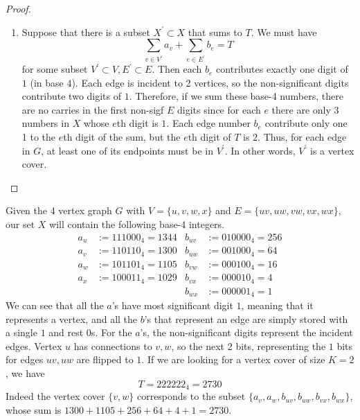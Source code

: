 \begin{proof}
\begin{enumerate}
      \item Suppose that there is a subset $X^\prime \subset X$ that sums to $T$. We must have 
      \begin{equation}
        \sum_{v \in V^\prime} a_v + \sum_{e \in E^\prime} b_e = T
      \end{equation}
      for some subset $V^\prime \subset V, E^\prime \subset E$. Then each $b_e$ contributes exactly one digit of $1$ (in base 4). Each edge is incident to 2 vertices, so the non-significant digits contribute two digits of $1$. Therefore, if we sum these base-4 numbers, there are no carries in the first non-sigf $E$ digits since for each $e$ there are only 3 numbers in $X$ whose $e$th digit is $1$. Each edge number $b_e$ contribute only one 1 to the $e$th digit of the sum, but the $e$th digit of $T$ is $2$. Thus, for each edge in $G$, at least one of its endpoints must be in $V^\prime$. In other words, $V^\prime$ is a vertex cover. 
    \end{enumerate}

  \end{proof}

  \begin{example}
    \label{ex:reduction-from-vertex-cover-to-subset-sum}
 
    Given the 4 vertex graph $G$ with $V = \{u, v, w, x\}$ and $E = \{uv, uw, vw, vx, wx\}$, our set $X$ will contain the following base-4 integers. 
    \begin{align*}
      a_u &:= 111000_4 = 1344 & b_{uv} &:= 010000_4 = 256 \\
      a_v &:= 110110_4 = 1300 & b_{uw} &:= 001000_4 = 64 \\
      a_w &:= 101101_4 = 1105 & b_{vw} &:= 000100_4 = 16 \\
      a_x &:= 100011_4 = 1029 & b_{vx} &:= 000010_4 = 4 \\
      & & b_{wx} &:= 000001_4 = 1
    \end{align*} 
    We can see that all the $a$'s have most significant digit $1$, meaning that it represents a vertex, and all the $b$'s that represent an edge are simply stored with a single $1$ and rest $0$s. For the $a$'s, the non-significant digits represent the incident edges. Vertex $u$ has connections to $v, w$, so the next 2 bits, representing the $1$ bits for edges $uv, uw$ are flipped to $1$. If we are looking for a vertex cover of size $K = 2$, we have 
    \begin{equation}
      T = 222222_4 = 2730
    \end{equation} 
    Indeed the vertex cover $\{v, w\}$ corresponds to the subset $\{a_v, a_w, b_{uv}, b_{uw}, b_{vx}, b_{wx}\}$, whose sum is $1300 + 1105 + 256 + 64 + 4 + 1 = 2730$. 
  \end{example}

